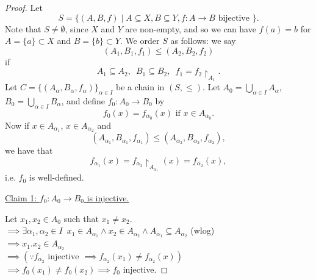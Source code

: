 \documentclass[notoc,notitlepage]{tufte-book}
\begin{document}
\begin{proof}
  Let
  \begin{equation*}
    S = \{ (A, B, f) \mid A \subseteq X, B \subseteq Y, f : A \to B \text{ bijective } \}.
  \end{equation*}
  Note that $S \neq \emptyset$, since $X$ and $Y$ are non-empty, and so we can have $f(a) = b$ for $A = \{a\} \subset X$ and $B = \{ b \} \subset Y$. We order $S$ as follows: we say
  \begin{equation*}
    (A_1, B_1, f_1) \leq (A_2, B_2, f_2)
  \end{equation*}
  if
  \begin{equation*}
    A_1 \subseteq A_2, \enspace B_1 \subseteq B_2, \enspace f_1 = f_2 \restriction_{A_1}.
  \end{equation*}
  Let $C = \{ (A_\alpha, B_\alpha, f_\alpha) \}_{\alpha \in I}$ be a chain in $(S, \leq)$. Let $A_0 = \bigcup_{\alpha \in I} A_\alpha$, $B_0 = \bigcup_{\alpha \in I} B_\alpha$, and define $f_0 : A_0 \to B_0$ by
  \begin{equation*}
    f_0(x) = f_{\alpha_0} (x) \text{ if } x \in A_{\alpha_0}.
  \end{equation*}
  Now if $x \in A_{\alpha_1}$, $x \in A_{\alpha_2}$ and
  \begin{equation*}
    (A_{\alpha_1}, B_{\alpha_1}, f_{\alpha_1}) \leq (A_{\alpha_2}, B_{\alpha_2}, f_{\alpha_2}),
  \end{equation*}
  we have that
  \begin{equation*}
    f_{\alpha_1}(x) = f_{\alpha_2} \restriction_{A_{\alpha_1}} (x) = f_{\alpha_2} (x),
  \end{equation*}
  i.e. $f_0$ is well-defined.

  \noindent\underline{Claim 1: $f_0 : A_0 \to B_0$ is injective.}

  Let $x_1, x_2 \in A_0$ such that $x_1 \neq x_2$. \\
  \noindent $\implies \exists \alpha_1, \alpha_2 \in I \enspace x_1 \in A_{\alpha_1} \land x_2 \in A_{\alpha_2} \land A_{\alpha_1} \subseteq A_{\alpha_2}$ (wlog) \\
  \noindent $\implies x_1. x_2 \in A_{\alpha_2}$ \\
  \noindent $\implies ( \because f_{\alpha_2} \text{ injective } \implies f_{\alpha_2}(x_1) \neq f_{\alpha_2}(x) )$ \\
  \noindent $\implies f_0(x_1) \neq f_0(x_2) \implies f_0$ injective.


\end{proof}
\end{document}
